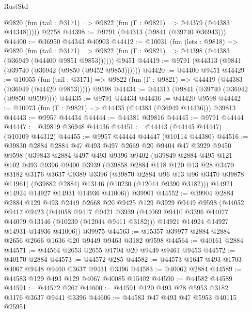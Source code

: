 \begin{lexlean}{RustStd}
\begin{coremodule}
      @9820 (fun (tail : @3171) => @9822 (fun (Γ : @9821) => @44379 (@44383 @44348)))))
    @2758
@44398 := @9791 (@44313 (@9841 (@39740 @36943)))
@44400 := @36950 @44343 @40903
@44412 := @10031
    (fun (lets : @9818) =>
    @9820
      (fun (tail : @3171) =>
      @9822 (fun (Γ : @9821) => @44398 (@44383 (@36949 (@44400 @9851 @9853))))))
    @9451
@44419 := @9791 (@44313 (@9841 (@39740 (@36942 (@9850 (@9452 @9853))))))
@44420 := @44400 @9451
@44429 := @10055
    (fun (tail : @3171) => @9822 (fun (Γ : @9821) => @44419 (@44383 (@36949 (@44420 @9853)))))
    @9598
@44434 := @44313 (@9841 (@39740 (@36942 (@9850 @9599))))
@44435 := @9791 @44434
@44436 := @44420 @9598
@44442 := @10073 (fun (Γ : @9821) => @44435 (@44383 (@36949 @44436))) @39813
@44443 := @9957 @44434
@44444 := @44381 @39816
@44445 := @9791 @44444
@44447 := @39819 @36948 @44436
@44451 := @44443 (@44445 @44447) (@10109 @44312)
@44455 := @9957 @44444 @44447 (@10114 @44380)
@44516 := @39830
    @2884
    @2884
    @47
    @493
    @497
    @2669
    @20
    @9404
    @47
    @3929
    @9450
    @9598
    (@39843
      @2884
      @497
      @493
      @9396
      @9402
      (@39849
        @2884
        @495
        @121
        @102
        @493
        @9396
        @9400
        @3939
        (@39858
          @2884
          @118
          @120
          @13
          @28
          @3470
          @3182
          @3176
          @3637
          @9389
          @3396
          (@39870 @2884 @96 @13 @96 @3470 @39878 @11961)
          (@39882 @2884)
          @13146
          (@10230 (@12044 @9390 @3182)))
        @14921
        @14924
        @14927
        @14931
        @14936
        @41006))
    @39901
@44552 := @39904
    @2884
    @2884
    @129
    @493
    @2449
    @2668
    @20
    @9425
    @129
    @3929
    @9449
    @9598
    (@44052
      @9417
      @9423
      (@44058
        @9417
        @9421
        @3939
        (@44069 @9410 @3396 @44077 @44079 @13146 (@10230 (@12044 @9411 @3182)))
        @14921
        @14924
        @14927
        @14931
        @14936
        @41006))
    @39975
@44563 := @15357 @39977 @2884 @2884 @2656 @2666 @1636 @20 @9449 @9463 @3182 @9598
@44564 := @40161 @2884
@44571 := @44564 @2653 @2655 @1704 @20 @9449 @9461 @9453
@44572 := @40170 @2884
@44573 := @44572 @285
@44582 := @44573 @1647 @493 @1703 @4067 @9448 @9460 @3637 @9431 @3396
@44583 := @40062 @2884
@44589 := @44583 @129 @493 @129 @4067 @40085 @15402
@44590 := @44582 @44589
@44591 := @44572 @267
@44600 := @44591 @120 @493 @28 @5953 @3182 @3176 @3637 @9441 @3396
@44606 := @44583 @47 @493 @47 @5953 @40115 @25951

\end{coremodule}
\end{lexlean}
